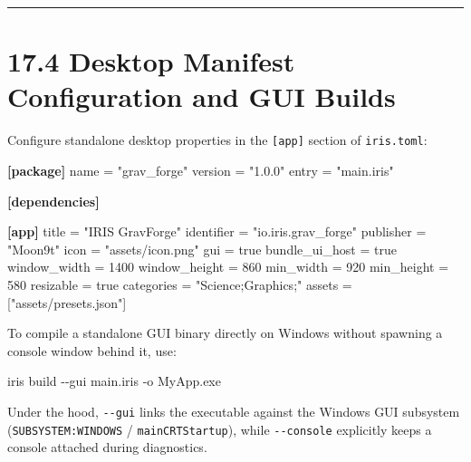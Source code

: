 \documentclass[
  english,
  oneside]{book}
\newenvironment{Shaded}{\begin{snugshade}}{\end{snugshade}}
\newcommand{\ConstantTok}[1]{\textcolor[rgb]{0.31,0.76,1.00}{#1}}
\newcommand{\DataTypeTok}[1]{\textcolor[rgb]{0.31,0.79,0.69}{#1}}
\newcommand{\DecValTok}[1]{\textcolor[rgb]{0.71,0.81,0.66}{#1}}
\newcommand{\KeywordTok}[1]{\textcolor[rgb]{0.34,0.61,0.84}{\textbf{#1}}}
\newcommand{\NormalTok}[1]{\textcolor[rgb]{0.83,0.83,0.83}{#1}}
\newcommand{\OperatorTok}[1]{\textcolor[rgb]{0.83,0.83,0.83}{#1}}
\newcommand{\StringTok}[1]{\textcolor[rgb]{0.81,0.57,0.47}{#1}}
\begin{document}
\begin{center}\rule{0.5\linewidth}{0.5pt}\end{center}

\section{17.4 Desktop Manifest Configuration and GUI
Builds}\label{desktop-manifest-configuration-and-gui-builds}

Configure standalone desktop properties in the \texttt{{[}app{]}}
section of \texttt{iris.toml}:

\begin{Shaded}
\begin{Highlighting}[]
\KeywordTok{[package]}
\DataTypeTok{name} \OperatorTok{=} \StringTok{"grav\_forge"}
\DataTypeTok{version} \OperatorTok{=} \StringTok{"1.0.0"}
\DataTypeTok{entry} \OperatorTok{=} \StringTok{"main.iris"}

\KeywordTok{[dependencies]}

\KeywordTok{[app]}
\DataTypeTok{title} \OperatorTok{=} \StringTok{"IRIS GravForge"}
\DataTypeTok{identifier} \OperatorTok{=} \StringTok{"io.iris.grav\_forge"}
\DataTypeTok{publisher} \OperatorTok{=} \StringTok{"Moon9t"}
\DataTypeTok{icon} \OperatorTok{=} \StringTok{"assets/icon.png"}
\DataTypeTok{gui} \OperatorTok{=} \ConstantTok{true}
\DataTypeTok{bundle\_ui\_host} \OperatorTok{=} \ConstantTok{true}
\DataTypeTok{window\_width} \OperatorTok{=} \DecValTok{1400}
\DataTypeTok{window\_height} \OperatorTok{=} \DecValTok{860}
\DataTypeTok{min\_width} \OperatorTok{=} \DecValTok{920}
\DataTypeTok{min\_height} \OperatorTok{=} \DecValTok{580}
\DataTypeTok{resizable} \OperatorTok{=} \ConstantTok{true}
\DataTypeTok{categories} \OperatorTok{=} \StringTok{"Science;Graphics;"}
\DataTypeTok{assets} \OperatorTok{=} \OperatorTok{[}\StringTok{"assets/presets.json"}\OperatorTok{]}
\end{Highlighting}
\end{Shaded}

To compile a standalone GUI binary directly on Windows without spawning
a console window behind it, use:

\begin{Shaded}
\begin{Highlighting}[]
\NormalTok{iris build {-}{-}gui main.iris {-}o MyApp.exe}
\end{Highlighting}
\end{Shaded}

Under the hood, \texttt{-\/-gui} links the executable against the
Windows GUI subsystem (\texttt{SUBSYSTEM:WINDOWS} /
\texttt{mainCRTStartup}), while \texttt{-\/-console} explicitly keeps a
console attached during diagnostics.
\end{document}

